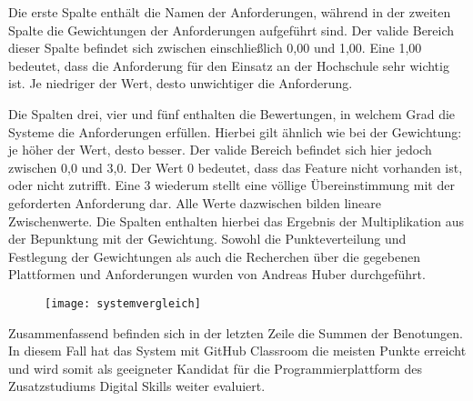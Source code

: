 Die erste Spalte enthält die Namen der Anforderungen, während in der zweiten
Spalte die Gewichtungen der Anforderungen aufgeführt sind. Der valide Bereich
dieser Spalte befindet sich zwischen einschließlich 0,00 und 1,00. Eine 1,00
bedeutet, dass die Anforderung für den Einsatz an der Hochschule sehr wichtig
ist. Je niedriger der Wert, desto unwichtiger die Anforderung.

Die Spalten drei, vier und fünf enthalten die Bewertungen, in welchem Grad die
Systeme die Anforderungen erfüllen. Hierbei gilt ähnlich wie bei der Gewichtung:
je höher der Wert, desto besser. Der valide Bereich befindet sich hier jedoch
zwischen 0,0 und 3,0. Der Wert 0 bedeutet, dass das Feature nicht vorhanden ist,
oder nicht zutrifft. Eine 3 wiederum stellt eine völlige Übereinstimmung mit der
geforderten Anforderung dar. Alle Werte dazwischen bilden lineare Zwischenwerte.
Die Spalten enthalten hierbei das Ergebnis der Multiplikation aus der Bepunktung
mit der Gewichtung. Sowohl die Punkteverteilung und Festlegung der Gewichtungen
als auch die Recherchen über die gegebenen Plattformen und Anforderungen wurden
von Andreas Huber durchgeführt.

\begin{figure}[H]
    \centering
    \texttt{[image: systemvergleich]}
    \label{fig:systemvergleich}
\end{figure}

\newpage

Zusammenfassend befinden sich in der letzten Zeile die Summen der Benotungen. In
diesem Fall hat das System mit GitHub Classroom die meisten Punkte erreicht und
wird somit als geeigneter Kandidat für die Programmierplattform des
Zusatzstudiums Digital Skills weiter evaluiert.